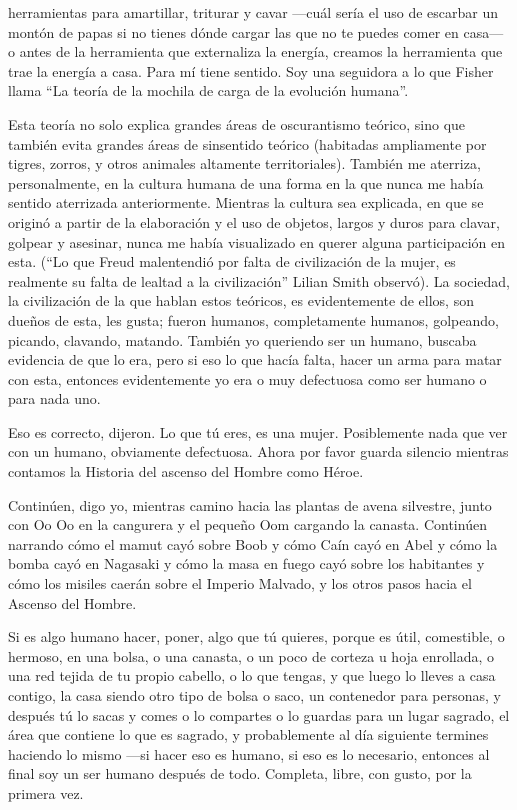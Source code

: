 herramientas para amartillar, triturar y cavar 
---cuál sería el uso de escarbar un montón de papas
si no tienes dónde cargar las que no te puedes
comer en casa--- o antes de la herramienta que
externaliza la energía, creamos la herramienta
que trae la energía a casa. Para mí tiene sentido.
Soy una seguidora a lo que Fisher llama ``La
teoría de la mochila de carga de la evolución
humana''.

Esta teoría no solo explica grandes áreas de
oscurantismo teórico, sino que también evita
grandes áreas de sinsentido teórico (habitadas
ampliamente por tigres, zorros, y otros animales
altamente territoriales). También me aterriza,
personalmente, en la cultura humana de una
forma en la que nunca me había sentido
aterrizada anteriormente. Mientras la cultura sea
explicada, en que se originó a partir de la
elaboración y el uso de objetos, largos y duros
para clavar, golpear y asesinar, nunca me había
visualizado en querer alguna participación en
esta. (``Lo que Freud malentendió por falta de
civilización de la mujer, es realmente su falta de
lealtad a la civilización'' Lilian Smith observó). La
sociedad, la civilización de la que hablan estos
teóricos, es evidentemente de ellos, son dueños
de esta, les gusta; fueron humanos,
completamente humanos, golpeando, picando,
clavando, matando. También yo queriendo ser
un humano, buscaba evidencia de que lo era,
pero si eso lo que hacía falta, hacer un arma para
matar con esta, entonces evidentemente yo era o
muy defectuosa como ser humano o para nada uno.

Eso es correcto, dijeron. Lo que tú eres, es una
mujer. Posiblemente nada que ver con un
humano, obviamente defectuosa. Ahora por
favor guarda silencio mientras contamos la
Historia del ascenso del Hombre como Héroe.

Continúen, digo yo, mientras camino hacia las
plantas de avena silvestre, junto con Oo Oo en la
cangurera y el pequeño Oom cargando la
canasta. Continúen narrando cómo el mamut
cayó sobre Boob y cómo Caín cayó en Abel y
cómo la bomba cayó en Nagasaki y cómo la masa
en fuego cayó sobre los habitantes y cómo los
misiles caerán sobre el Imperio Malvado, y los
otros pasos hacia el Ascenso del Hombre.

Si es algo humano hacer, poner, algo que tú
quieres, porque es útil, comestible, o hermoso,
en una bolsa, o una canasta, o un poco de corteza
u hoja enrollada, o una red tejida de tu propio
cabello, o lo que tengas, y que luego lo lleves a
casa contigo, la casa siendo otro tipo de bolsa o
saco, un contenedor para personas, y después tú
lo sacas y comes o lo compartes o lo guardas para
un lugar sagrado, el área que contiene lo que es
sagrado, y probablemente al día siguiente
termines haciendo lo mismo ---si hacer eso es
humano, si eso es lo necesario, entonces al final
soy un ser humano después de todo. Completa,
libre, con gusto, por la primera vez.

